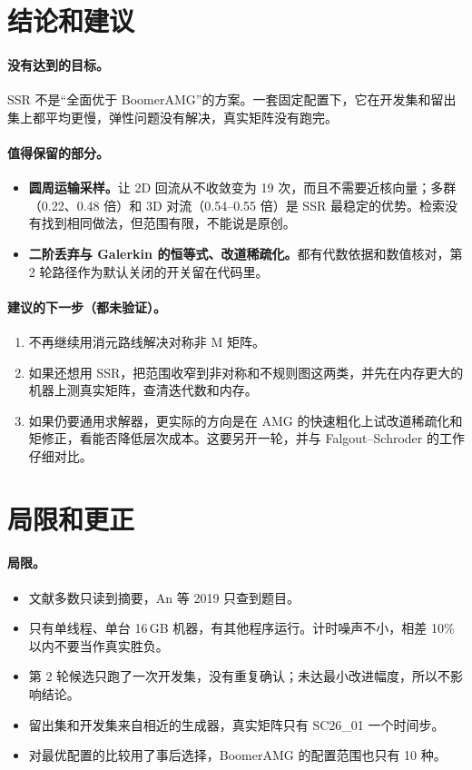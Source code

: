 \documentclass[11pt,a4paper]{ctexart}
\begin{document}
\section{结论和建议}
\paragraph{没有达到的目标。}SSR 不是“全面优于 BoomerAMG”的方案。一套固定配置下，它在开发集和留出集上都平均更慢，弹性问题没有解决，真实矩阵没有跑完。

\paragraph{值得保留的部分。}
\begin{itemize}
\item \textbf{圆周运输采样。}让 2D 回流从不收敛变为 19 次，而且不需要近核向量；多群（0.22、0.48 倍）和 3D 对流（0.54--0.55 倍）是 SSR 最稳定的优势。检索没有找到相同做法，但范围有限，不能说是原创。
\item \textbf{二阶丢弃与 Galerkin 的恒等式、改道稀疏化。}都有代数依据和数值核对，第 2 轮路径作为默认关闭的开关留在代码里。
\end{itemize}

\paragraph{建议的下一步（都未验证）。}
\begin{enumerate}
\item 不再继续用消元路线解决对称非 M 矩阵。
\item 如果还想用 SSR，把范围收窄到非对称和不规则图这两类，并先在内存更大的机器上测真实矩阵，查清迭代数和内存。
\item 如果仍要通用求解器，更实际的方向是在 AMG 的快速粗化上试改道稀疏化和矩修正，看能否降低层次成本。这要另开一轮，并与 Falgout--Schroder 的工作仔细对比。
\end{enumerate}

\section{局限和更正}
\paragraph{局限。}
\begin{itemize}
\item 文献多数只读到摘要，An 等 2019 只查到题目。
\item 只有单线程、单台 16\,GB 机器，有其他程序运行。计时噪声不小，相差 10\% 以内不要当作真实胜负。
\item 第 2 轮候选只跑了一次开发集，没有重复确认；未达最小改进幅度，所以不影响结论。
\item 留出集和开发集来自相近的生成器，真实矩阵只有 SC26\_01 一个时间步。
\item 对最优配置的比较用了事后选择，BoomerAMG 的配置范围也只有 10 种。
\end{itemize}
\end{document}
